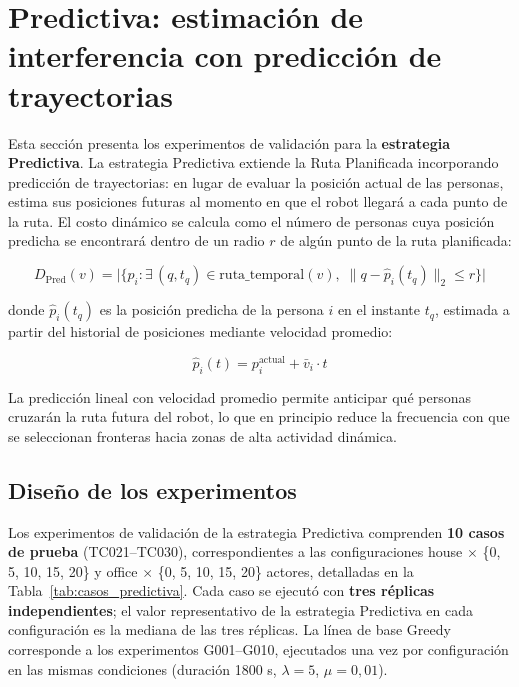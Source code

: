 \section{Predictiva: estimación de interferencia con predicción de trayectorias}%
\label{sec:exp_e3}

Esta sección presenta los experimentos de validación para la \textbf{estrategia Predictiva}. La estrategia Predictiva extiende la Ruta Planificada incorporando predicción de trayectorias: en lugar de evaluar la posición actual de las personas, estima sus posiciones futuras al momento en que el robot llegará a cada punto de la ruta. El costo dinámico se calcula como el número de personas cuya posición predicha se encontrará dentro de un radio $r$ de algún punto de la ruta planificada:

\begin{equation}
    D_{\text{Pred}}(v) = \bigl|\{ p_i : \exists\, (q, t_q) \in \text{ruta\_temporal}(v),\;
    \| q - \hat{p}_i(t_q) \|_2 \leq r \}\bigr|
\end{equation}

\noindent donde $\hat{p}_i(t_q)$ es la posición predicha de la persona $i$ en el instante $t_q$, estimada a partir del historial de posiciones mediante velocidad promedio:

\begin{equation}
    \hat{p}_i(t) = p_i^{\text{actual}} + \bar{v}_i \cdot t
\end{equation}

La predicción lineal con velocidad promedio permite anticipar qué personas cruzarán la ruta futura del robot, lo que en principio reduce la frecuencia con que se seleccionan fronteras hacia zonas de alta actividad dinámica.

\subsection{Diseño de los experimentos}

Los experimentos de validación de la estrategia Predictiva comprenden \textbf{10 casos de prueba} (TC021–TC030), correspondientes a las configuraciones house $\times$ \{0, 5, 10, 15, 20\} y office $\times$ \{0, 5, 10, 15, 20\} actores, detalladas en la Tabla~\ref{tab:casos_predictiva}. Cada caso se ejecutó con \textbf{tres réplicas independientes}; el valor representativo de la estrategia Predictiva en cada configuración es la mediana de las tres réplicas. La línea de base Greedy corresponde a los experimentos G001–G010, ejecutados una vez por configuración en las mismas condiciones (duración 1800 s, $\lambda = 5$, $\mu = 0{,}01$).

